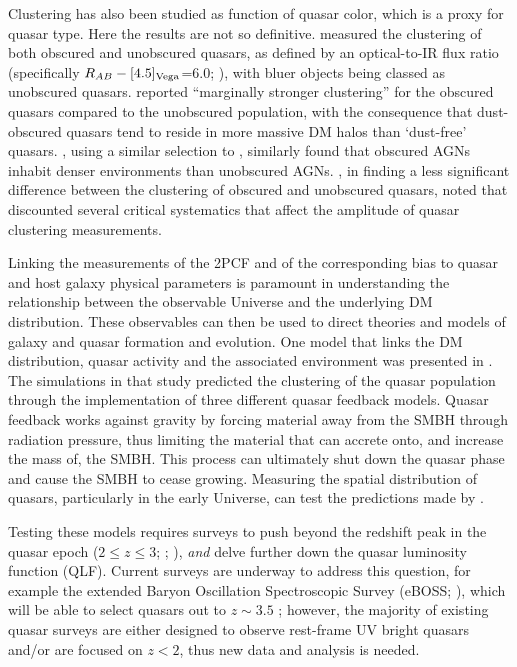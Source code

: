 \documentclass[apj, numberedappendix]{emulateapj}
\begin{document}
Clustering has also been studied as function of quasar color, which is a proxy for quasar type. Here the results are not so definitive. \citet{Hickox2011} measured the clustering of both obscured and unobscured quasars, as defined by an optical-to-IR flux ratio (specifically $R_{AB}-[4.5]_{\rm Vega}$=6.0; \citealt{Hickox2007}), with bluer objects being classed as unobscured quasars. \citet{Hickox2011} reported ``marginally stronger clustering'' for the obscured quasars compared to the unobscured population, with the consequence that dust-obscured quasars tend to reside in more massive DM halos than `dust-free' quasars. \citet{Donoso2014}, using a similar selection to \citet{Hickox2011}, similarly found that obscured AGNs inhabit denser environments than unobscured AGNs. \citet{DiPompeo2014,DiPompeo2015,DiPompeo2016}, in finding a less significant difference between the clustering of obscured and unobscured quasars, noted that \citet{Donoso2014} discounted several critical systematics that affect the amplitude of quasar clustering measurements.

Linking the measurements of the 2PCF and of the corresponding bias to quasar and host galaxy physical parameters is paramount in understanding the relationship between the observable Universe and the underlying DM distribution. These observables can then be used to direct theories and models of galaxy and quasar formation and evolution. One model that links the DM distribution, quasar activity and the associated environment was presented in \citet{Hopkins2007}. The simulations in that study predicted the clustering of the quasar population through the implementation of three different quasar feedback models. Quasar feedback works against gravity by forcing material away from the SMBH through radiation pressure, thus limiting the material that can accrete onto, and increase the mass of, the SMBH. This process can ultimately shut down the quasar phase and cause the SMBH to cease growing. Measuring the spatial distribution of quasars, particularly in the early Universe, can test the predictions made by \citet{Hopkins2007}. 

Testing these models requires surveys to push beyond the redshift peak in the quasar epoch ($2 \leq z \leq 3$; \citealt{Schmidt1995}; \citealt{Boyle2000}), \emph{and} delve further down the quasar luminosity function (QLF). Current surveys are underway to address this question, for example the extended Baryon Oscillation Spectroscopic Survey (eBOSS; \citealt{Dawson2016}), which will be able to select quasars out to $z \sim 3.5$ \citep{Myers2015}; however, the majority of existing quasar surveys are either designed to observe rest-frame UV bright quasars and/or are focused on $z<2$, thus new data and analysis is needed. 
\end{document}
